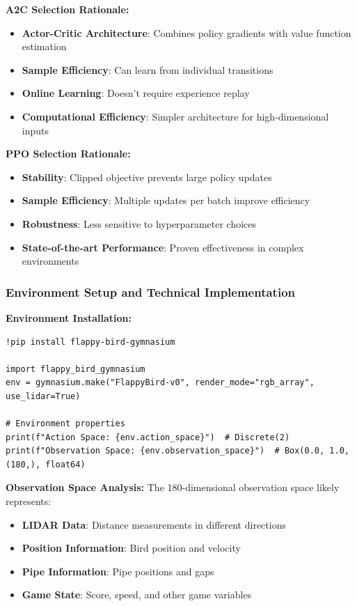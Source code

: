 \documentclass[12pt]{article}
\begin{document}
{{{\textbf{A2C Selection Rationale:}
\begin{itemize}
    \item \textbf{Actor-Critic Architecture}: Combines policy gradients with value function estimation
    \item \textbf{Sample Efficiency}: Can learn from individual transitions
    \item \textbf{Online Learning}: Doesn't require experience replay
    \item \textbf{Computational Efficiency}: Simpler architecture for high-dimensional inputs
\end{itemize}

\textbf{PPO Selection Rationale:}
\begin{itemize}
    \item \textbf{Stability}: Clipped objective prevents large policy updates
    \item \textbf{Sample Efficiency}: Multiple updates per batch improve efficiency
    \item \textbf{Robustness}: Less sensitive to hyperparameter choices
    \item \textbf{State-of-the-art Performance}: Proven effectiveness in complex environments
\end{itemize}

\subsubsection{Environment Setup and Technical Implementation}

\textbf{Environment Installation:}
\begin{verbatim}
!pip install flappy-bird-gymnasium

import flappy_bird_gymnasium
env = gymnasium.make("FlappyBird-v0", render_mode="rgb_array", use_lidar=True)

# Environment properties
print(f"Action Space: {env.action_space}")  # Discrete(2)
print(f"Observation Space: {env.observation_space}")  # Box(0.0, 1.0, (180,), float64)
\end{verbatim}

\textbf{Observation Space Analysis:}
The 180-dimensional observation space likely represents:
\begin{itemize}
    \item \textbf{LIDAR Data}: Distance measurements in different directions
    \item \textbf{Position Information}: Bird position and velocity
    \item \textbf{Pipe Information}: Pipe positions and gaps
    \item \textbf{Game State}: Score, speed, and other game variables
\end{itemize}

}}}
\end{document}
